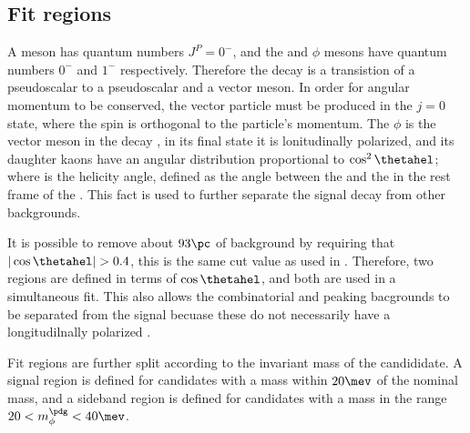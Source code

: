 \subsection{Fit regions}
\label{sec:dsphi:hel}
A \Bp meson has quantum numbers $J^P=0^-$, and the \Ds and $\phi$ mesons have
quantum numbers $0^-$ and $1^-$ respectively.
Therefore the decay \btodsphi is a transistion of a pseudoscalar to a pseudoscalar and a vector
meson.
In order for angular momentum to be conserved, the vector particle must be produced in the $j=0$
state, where the spin is orthogonal to the particle's momentum.
The $\phi$ is the vector meson in the decay \btodsphi, in its final state it is lonitudinally
polarized, and its daughter kaons have an angular distribution proportional to $\cos^2\thetahel$;
where \thetahel is the helicity angle, defined as the angle between the \Kp and the \Bp in the rest frame of the \Ds.
This fact is used to further separate the signal decay \btodsphi from other backgrounds.


It is possible to remove about $93\pc$ of background by requiring that $|\cos\thetahel|>0.4$,
this is the same cut value as used in .
Therefore, two regions are defined in terms of $\cos\thetahel$, and both are used in a simultaneous
fit.
This also allows the combinatorial and peaking bacgrounds to be separated from the signal becuase
these do not necessarily have a longitudilnally polarized \phii.





Fit regions are further split according to the invariant mass of the \phii candididate.
A signal region is defined for \phitokk candidates with a mass within $20\mev$ of the nominal \phii
mass, and a sideband region is defined for candidates with a mass in the range
$20<m_\phi^\pdg<40\mev$.

